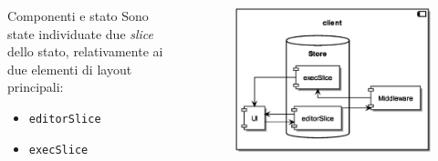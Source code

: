     \begin{frame}{\insertsectionhead}{\insertsubsectionhead}

      \begin{columns}
        \begin{column}{.5\textwidth}
          \begin{block}{Componenti e stato}
            Sono state individuate due \emph{slice} dello stato, relativamente ai due elementi di layout principali:
            \begin{itemize}
              \item<2-> \texttt{editorSlice}
              \item<3-> \texttt{execSlice}
            \end{itemize}
          \end{block}
        \end{column}
        \begin{column}{.45\textwidth}
          \begin{figure}
            \includegraphics[width=.9\textwidth]{res/uml/architecture-design-client.eps}
          \end{figure}
        \end{column}
      \end{columns}

    \end{frame}

